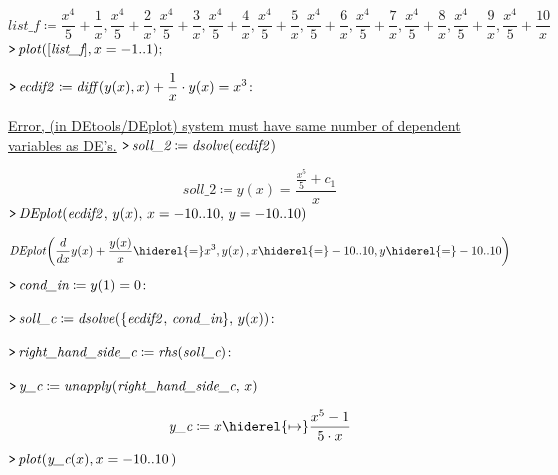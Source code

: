 \documentclass{article}
\begin{document}
\begin{dmath}\label{(31)}
\textit{list\_f} \coloneqq \frac{x^{4}}{5}+\frac{1}{x},\frac{x^{4}}{5}+\frac{2}{x},\frac{x^{4}}{5}+\frac{3}{x},\frac{x^{4}}{5}+\frac{4}{x},\frac{x^{4}}{5}+\frac{5}{x},\frac{x^{4}}{5}+\frac{6}{x},\frac{x^{4}}{5}+\frac{7}{x},\frac{x^{4}}{5}+\frac{8}{x},\frac{x^{4}}{5}+\frac{9}{x},\frac{x^{4}}{5}+\frac{10}{x}
\end{dmath}
\mapleinput
{$ \displaystyle \texttt{>\,} \mathit{plot} ([\textit{list\_f}],x =-1..1); $}

{}
\mapleinput
{$ \displaystyle \texttt{>\,} \mathit{ecdif2} \coloneqq \mathit{diff} (y (x),x)+\frac{1}{x}\cdot y (x)=x^{3}\colon  $}

\href{http://www.maplesoft.com/support/help/errors/view.aspx?path=Error,%20(in%20DEtools%2FDEplot)%20system%20must%20have%20same%20number%20of%20dependent%20variables%20as%20DE's.}{Error, (in DEtools/DEplot) system must have same number of dependent variables as DE's.}\mapleinput
{$ \displaystyle \texttt{>\,} \textit{soll\_2} \coloneqq \mathit{dsolve} (\mathit{ecdif2}) $}

\begin{dmath}\label{(32)}
\textit{soll\_2} \coloneqq y \! \left(x \right)=\frac{\frac{x^{5}}{5}+c_{1}}{x}
\end{dmath}
\mapleinput
{$ \displaystyle \texttt{>\,} \mathit{DEplot} (\mathit{ecdif2} ,\,y (x),\,x =-10..10,\,y =-10..10) $}

\begin{dmath}\label{(33)}
\mathit{DEplot} \! \left(\frac{d}{d x}y \! \left(x \right)+\frac{y \! \left(x \right)}{x} \hiderel{=} x^{3},y \! \left(x \right),x  \hiderel{=} -10..10,y  \hiderel{=} -10..10\right)
\end{dmath}
\mapleinput
{$ \displaystyle \texttt{>\,} \textit{cond\_in} \coloneqq y (1)=0\colon  $}

\mapleinput
{$ \displaystyle \texttt{>\,} \textit{soll\_c} \coloneqq \mathit{dsolve} (\{\mathit{ecdif2} ,\,\textit{cond\_in} \},\,y (x))\colon  $}

\mapleinput
{$ \displaystyle \texttt{>\,} \textit{right\_hand\_side\_c} \coloneqq \mathit{rhs} (\textit{soll\_c})\colon  $}

\mapleinput
{$ \displaystyle \texttt{>\,} \textit{y\_c} \coloneqq \mathit{unapply} (\textit{right\_hand\_side\_c} ,\,x) $}

\begin{dmath}\label{(34)}
\textit{y\_c} \coloneqq x \hiderel{\mapsto }\frac{x^{5}-1}{5\cdot x}
\end{dmath}
\mapleinput
{$ \displaystyle \texttt{>\,} \mathit{plot} (\textit{y\_c} (x),x =-10..10\,) $}
\end{document}
